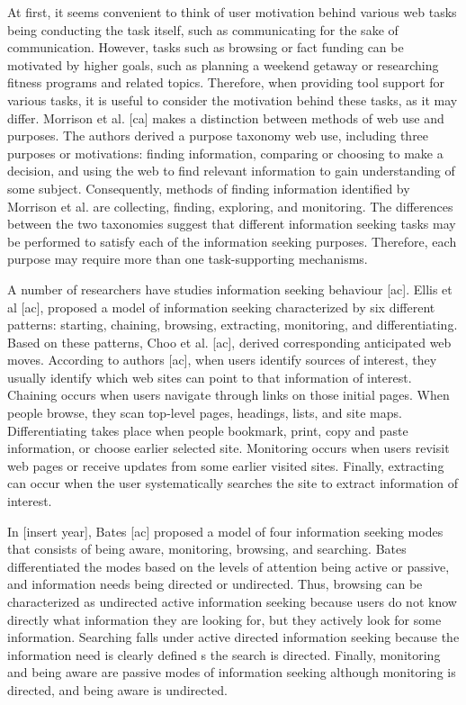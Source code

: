 \documentclass{casconpaper}
\begin{document}
{At first, it seems convenient to think of user motivation behind various web tasks being conducting the task itself, such as communicating for the sake of communication. However, tasks such as browsing or fact funding can be motivated by higher goals, such as planning a weekend getaway or researching fitness programs and related topics. Therefore, when providing tool support for various tasks, it is useful to consider the motivation behind these tasks, as it may differ. Morrison et al. [ca] makes a distinction between methods of web use and purposes. The authors derived a purpose taxonomy web use, including three purposes or motivations: finding information, comparing or choosing to make a decision, and using the web to find relevant information to gain understanding of some subject. Consequently, methods of finding information identified by Morrison et al. are collecting, finding, exploring, and monitoring. The differences between the two taxonomies suggest that different information seeking tasks may be performed to satisfy each of the information seeking purposes. Therefore, each purpose may require more than one task-supporting mechanisms. 

A number of researchers have studies information seeking behaviour [ac]. Ellis et al [ac], proposed a model of information seeking characterized by six different patterns: starting, chaining, browsing, extracting, monitoring, and differentiating. Based on these patterns, Choo et al. [ac], derived corresponding anticipated web moves. According to authors [ac], when users identify sources of interest, they usually identify which web sites can point to that information of interest.  Chaining occurs when users navigate through links on those initial pages. When people browse, they scan top-level pages, headings, lists, and site maps. Differentiating takes place when people bookmark, print, copy and paste information, or choose earlier selected site. Monitoring occurs when users revisit web pages or receive updates from some earlier visited sites. Finally, extracting can occur when the user systematically searches the site to extract information of interest. 

In [insert year], Bates [ac] proposed a model of four information seeking modes that consists of being aware, monitoring, browsing, and searching. Bates differentiated the modes based on the levels of attention being active or passive, and information needs being directed or undirected. Thus, browsing can be characterized as undirected active information seeking because users do not know directly what information they are looking for, but they actively look for some information. Searching falls under active directed information seeking because the information need is clearly defined s the search is directed. Finally, monitoring and being aware are passive modes of information seeking although monitoring is directed, and being aware is undirected.   

}
\end{document}
